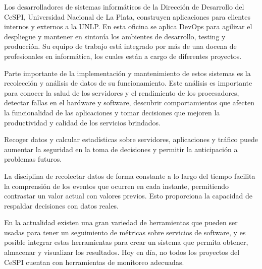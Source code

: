 Los desarrolladores de sistemas informáticos de la Dirección de Desarrollo del CeSPI, Universidad Nacional de La Plata, construyen aplicaciones para clientes internos y externos a la UNLP. En esta oficina se aplica DevOps para agilizar el despliegue y mantener en sintonía los ambientes de desarrollo, testing y producción. Su equipo de trabajo está integrado por más de una docena de profesionales en informática, los cuales están a cargo de diferentes proyectos.

Parte importante de la implementación y mantenimiento de estos sistemas es la recolección y análisis de datos de su funcionamiento. Este análisis es importante para conocer la salud de los servidores y el rendimiento de los procesadores, detectar fallas en el hardware y software, descubrir comportamientos que afecten la funcionalidad de las aplicaciones y tomar decisiones que mejoren la productividad y calidad de los servicios brindados.

Recoger datos y calcular estadísticas sobre servidores, aplicaciones y tráfico puede aumentar la seguridad en la toma de decisiones y permitir la anticipación a problemas futuros.

La disciplina de recolectar datos de forma constante a lo largo del tiempo facilita la comprensión de los eventos que ocurren en cada instante, permitiendo contrastar un valor actual con valores previos. Esto proporciona la capacidad de respaldar decisiones con datos reales.

En la actualidad existen una gran variedad de herramientas que pueden ser usadas para tener un seguimiento de métricas sobre servicios de software, y es posible integrar estas herramientas para crear un sistema que permita obtener, almacenar y visualizar los resultados. Hoy en día, no todos los proyectos del CeSPI cuentan con herramientas de monitoreo adecuadas.
